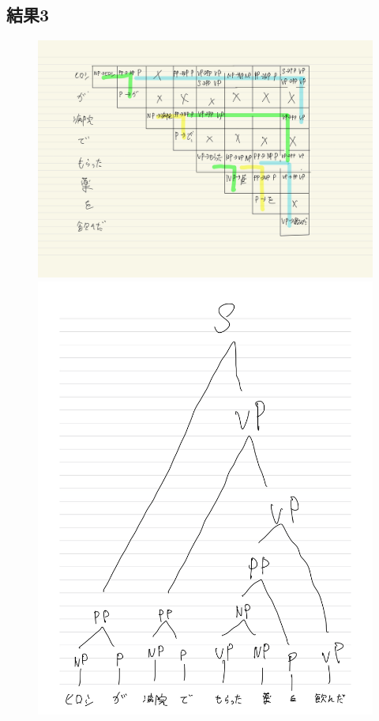 \documentclass[dvipdfmx,autodetect-engine,titlepage]{jsarticle}
\begin{document}
\subsection{結果3}

\begin{figure}[h]
  \centering
  \begin{minipage}[b]{0.45\linewidth}
  \begin{center}
    \includegraphics[keepaspectratio,scale=0.08]{pic5.jpg}
    \end{center}
    \caption{}
  \end{minipage}
  \begin{minipage}[b]{0.45\linewidth}
  \begin{center}
    \includegraphics[keepaspectratio,scale=0.08]{pic6.jpg}

\end{center}
\end{minipage}
\end{figure}
\end{document}
